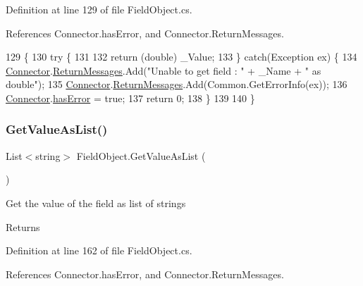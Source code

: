 Definition at line 129 of file Field\+Object.\+cs.



References Connector.\+has\+Error, and Connector.\+Return\+Messages.


\begin{DoxyCode}
129                                      \{
130         \textcolor{keywordflow}{try} \{
131 
132             \textcolor{keywordflow}{return} (\textcolor{keywordtype}{double}) \_Value;
133         \} \textcolor{keywordflow}{catch}(Exception ex) \{
134             \mbox{\hyperlink{class_connector}{Connector}}.\mbox{\hyperlink{class_connector_a1ed422674b344524fd77998dcf6a9ba6}{ReturnMessages}}.Add(\textcolor{stringliteral}{"Unable to get field : "} + \_Name + \textcolor{stringliteral}{" as
       double"});
135             \mbox{\hyperlink{class_connector}{Connector}}.\mbox{\hyperlink{class_connector_a1ed422674b344524fd77998dcf6a9ba6}{ReturnMessages}}.Add(Common.GetErrorInfo(ex));
136             \mbox{\hyperlink{class_connector}{Connector}}.\mbox{\hyperlink{class_connector_a079bae21a5417efa53bfe8954c0f533f}{hasError}} = \textcolor{keyword}{true};
137             \textcolor{keywordflow}{return} 0;
138         \}
139        
140     \}
\end{DoxyCode}
\mbox{\label{class_field_object_a635d7598cbf7bbc29821cb1c012de964}} 
\subsubsection{\texorpdfstring{Get\+Value\+As\+List()}{GetValueAsList()}}
{\footnotesize\ttfamily List$<$string$>$ Field\+Object.\+Get\+Value\+As\+List (\begin{DoxyParamCaption}{ }\end{DoxyParamCaption})}



Get the value of the field as list of strings 

\begin{DoxyReturn}{Returns}

\end{DoxyReturn}


Definition at line 162 of file Field\+Object.\+cs.



References Connector.\+has\+Error, and Connector.\+Return\+Messages.


